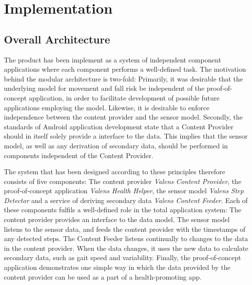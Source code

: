 \chapter{Implementation}


\section{Overall Architecture}
The product has been implement as a system of independent component applications where each component performs a well-defined task. The motivation behind the modular architecture is two-fold: Primarily, it was desirable that the underlying model for movement and fall risk be independent of the proof-of-concept application, in order to facilitate development of possible future applications employing the model. Likewise, it is desirable to enforce independence between the content provider and the sensor model. Secondly, the standards of Android application development state that a Content Provider should in itself solely provide a interface to the data. This implies that the sensor model, as well as any derivation of secondary data, should be performed in components independent of the Content Provider.

The system that has been designed according to these principles therefore consists of five components: The content provider \emph{Valens Content Provider}, the proof-of-concept application \emph{Valens Health Helper}, the sensor model \emph{Valens Step Detector} and a service of deriving secondary data \emph{Valens Content Feeder}. Each of these components fulfils a well-defined role in the total application system: The content provider provides an interface to the data model. The sensor model listens to the sensor data, and feeds the content provider with the timestamps of any detected steps. The Content Feeder listens continually to changes to the data in the content provider. When the data changes, it uses the new data to calculate secondary data, such as gait speed and variability. Finally, the proof-of-concept application demonstrates one simple way in which the data provided by the content provider can be used as a part of a health-promoting app.


